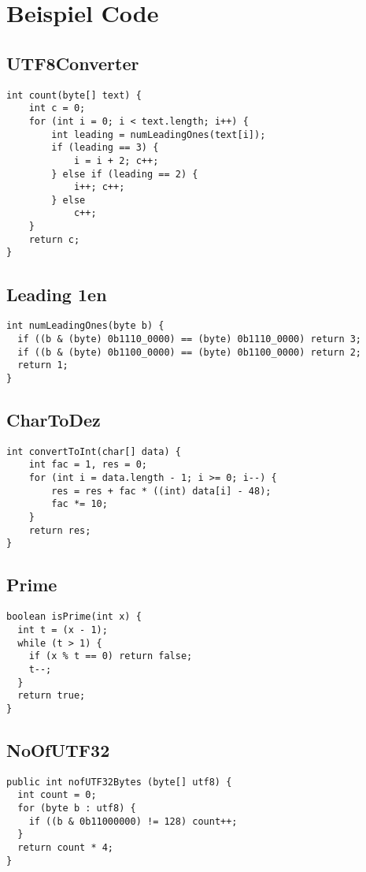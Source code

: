 \columnbreak
\section*{Beispiel Code}
\subsection*{UTF8Converter}
\begin{verbatim}
int count(byte[] text) {
    int c = 0;
    for (int i = 0; i < text.length; i++) {
        int leading = numLeadingOnes(text[i]);
        if (leading == 3) {
            i = i + 2; c++;
        } else if (leading == 2) {
            i++; c++;
        } else
            c++;
    }
    return c;
}
\end{verbatim}
\subsection*{Leading 1en}
\begin{verbatim}
int numLeadingOnes(byte b) {
  if ((b & (byte) 0b1110_0000) == (byte) 0b1110_0000) return 3;
  if ((b & (byte) 0b1100_0000) == (byte) 0b1100_0000) return 2;
  return 1;
}
\end{verbatim}
\subsection*{CharToDez}
\begin{verbatim}
int convertToInt(char[] data) {
    int fac = 1, res = 0;
    for (int i = data.length - 1; i >= 0; i--) {
        res = res + fac * ((int) data[i] - 48);
        fac *= 10;
    }
    return res;
}
\end{verbatim}
\subsection*{Prime}
\begin{verbatim}
boolean isPrime(int x) {
  int t = (x - 1);
  while (t > 1) {
    if (x % t == 0) return false;
    t--;
  }
  return true;
}	
\end{verbatim}
\subsection*{NoOfUTF32}
\begin{verbatim}
public int nofUTF32Bytes (byte[] utf8) {
  int count = 0;
  for (byte b : utf8) {
    if ((b & 0b11000000) != 128) count++;
  }
  return count * 4;
}
\end{verbatim}
